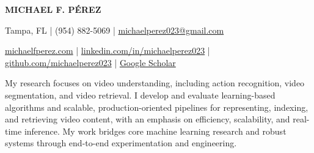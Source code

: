 \documentclass[11pt,letterpaper]{article}
\newcommand{\cvname}[1]{\begin{center}{\fontsize{18}{22}\selectfont\textbf{#1}}\end{center}\vspace{-9pt}}
\newcommand{\cvcontact}[1]{{\centering #1\par}}
\newcommand{\cvsummary}[1]{\par\vspace{9pt}#1\par}
\begin{document}
\cvname{MICHAEL F. PÉREZ}
\cvcontact{Tampa, FL | (954) 882-5069 | \href{mailto:michaelperez023@gmail.com}{michaelperez023@gmail.com}}
\cvcontact{\href{https://www.michaelfperez.com}{michaelfperez.com} | \href{https://www.linkedin.com/in/michaelperez023/}{linkedin.com/in/michaelperez023} | \href{https://github.com/michaelperez023}{github.com/michaelperez023} | \href{https://scholar.google.com/citations?user=fCzyXhUAAAAJ\&hl=en}{Google Scholar}}
\cvsummary{My research focuses on video understanding, including action recognition, video segmentation, and video retrieval. I develop and evaluate learning-based algorithms and scalable, production-oriented pipelines for representing, indexing, and retrieving video content, with an emphasis on efficiency, scalability, and real-time inference. My work bridges core machine learning research and robust systems through end-to-end experimentation and engineering.}
\end{document}
